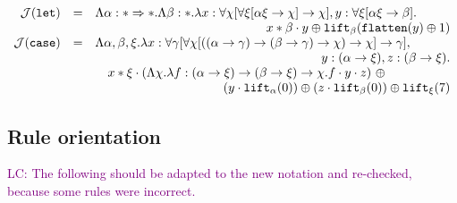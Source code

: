 \documentclass[runningheads,a4paper]{llncs}
\newcommand{\Termmap}{\mathcal{J}}
\newcommand{\quant}[2]{\forall #1[#2]}
\newcommand{\arrtype}{\rightarrow}
\newcommand{\arrkind}{\Rightarrow}
\newcommand{\abs}[2]{\lambda #1.#2}
\newcommand{\flatten}{\mathtt{flatten}}
\newcommand{\lift}{\mathtt{lift}}
\newcommand{\LC}[1]{\textcolor{purple}{LC: #1}}
\begin{document}
\[
\begin{array}{rcl}
\Termmap(\mathtt{let}) & = & \Lambda \alpha : * \arrkind * . \Lambda \beta : * . \lambda x : \quant{\chi}{
  \quant{\xi}{\alpha\xi \arrtype \chi} \arrtype \chi},
  y : \quant{\xi}{\alpha\xi \arrtype \beta}. \\
  & & \hfill x * \beta \cdot y \oplus \lift_{\beta}(\flatten(y) \oplus
  1) \\
\Termmap(\mathtt{case}) & = & \Lambda \alpha,\beta,\xi . \lambda x :
  \quant{\gamma}{\quant{\chi}{((\alpha \arrtype \gamma) \arrtype (\beta
  \arrtype \gamma) \arrtype \chi) \arrtype \chi} \arrtype \gamma},\\
  & & \phantom{A}\hfill
  y : (\alpha \arrtype \xi), z : (\beta \arrtype \xi). \\
  & & \quad
  x * \xi \cdot (\Lambda \chi.\abs{f:(\alpha \arrtype \xi) \arrtype
  (\beta \arrtype \xi) \arrtype \chi}{f \cdot y \cdot z})\ \oplus \\
  & & \quad\phantom{ABCDEFGHIJKL}
    (y \cdot \lift_\alpha(0)) \oplus (z \cdot \lift_\beta(0)) \oplus
    \lift_\xi(7) \\
\end{array}
\]

\subsection{Rule orientation}

\LC{The following should be adapted to the new notation and
  re-checked, because some rules were incorrect.}
\end{document}
